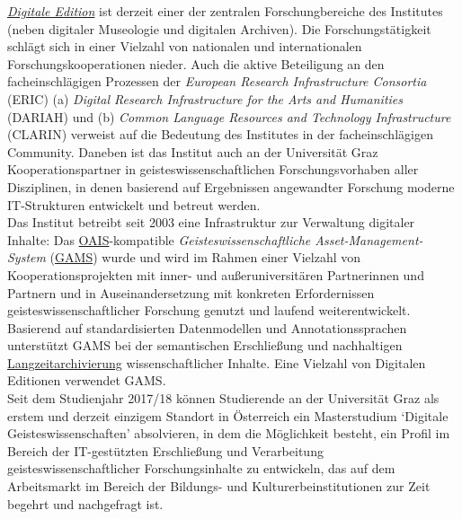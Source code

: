 \documentclass{article}
\begin{document}
        \emph{\href{http://gams.uni-graz.at/o:konde.59}{Digitale Edition}} ist derzeit einer der zentralen Forschungbereiche des Institutes (neben
                  digitaler Museologie und digitalen Archiven). Die Forschungstätigkeit schlägt sich
                  in einer Vielzahl von nationalen und internationalen Forschungskooperationen
                  nieder. Auch die aktive Beteiligung an den facheinschlägigen Prozessen der
                  \emph{European Research Infrastructure Consortia} (ERIC) (a) \emph{Digital Research
                  Infrastructure for the Arts and Humanities} (DARIAH) und (b) \emph{Common Language
                  Resources and Technology Infrastructure} (CLARIN) verweist auf die Bedeutung des
                  Institutes in der facheinschlägigen Community. Daneben ist das Institut auch an
                  der Universität Graz Kooperationspartner in geisteswissenschaftlichen
                  Forschungsvorhaben aller Disziplinen, in denen basierend auf Ergebnissen
                  angewandter Forschung moderne IT-Strukturen entwickelt und betreut werden. \\
            
         Das Institut betreibt seit 2003 eine Infrastruktur zur Verwaltung digitaler
                  Inhalte: Das \href{http://gams.uni-graz.at/o:konde.11}{OAIS}-kompatible
                  \emph{Geisteswissenschaftliche Asset-Management-System} (\href{http://gams.uni-graz.at/o:konde.70}{GAMS}) wurde und wird im Rahmen einer Vielzahl von
                  Kooperationsprojekten mit inner- und außeruniversitären Partnerinnen und Partnern
                  und in Auseinandersetzung mit konkreten Erfordernissen geisteswissenschaftlicher
                  Forschung genutzt und laufend weiterentwickelt. Basierend auf standardisierten
                  Datenmodellen und Annotationssprachen unterstützt GAMS bei der semantischen
                  Erschließung und nachhaltigen \href{http://gams.uni-graz.at/o:konde.6}{Langzeitarchivierung} wissenschaftlicher Inhalte. Eine Vielzahl von
                  Digitalen Editionen verwendet GAMS. \\
            
        Seit dem Studienjahr 2017/18 können Studierende an der Universität Graz als erstem
                  und derzeit einzigem Standort in Österreich ein Masterstudium ‘Digitale
                  Geisteswissenschaften’ absolvieren, in dem die Möglichkeit besteht, ein Profil im
                  Bereich der IT-gestützten Erschließung und Verarbeitung geisteswissenschaftlicher
                  Forschungsinhalte zu entwickeln, das auf dem Arbeitsmarkt im Bereich der Bildungs-
                  und Kulturerbeinstitutionen zur Zeit begehrt und nachgefragt ist. \\
            
\end{document}
